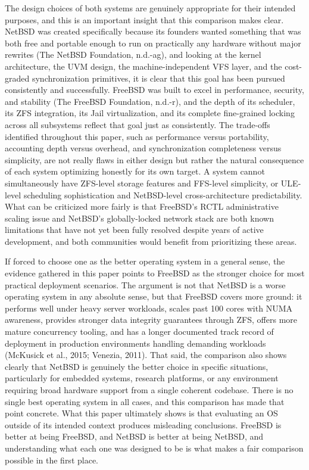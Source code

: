 The design choices of both systems are genuinely appropriate for their intended purposes, and this is an important insight that this comparison makes clear. NetBSD was created specifically because its founders wanted something that was both free and portable enough to run on practically any hardware without major rewrites (The NetBSD Foundation, n.d.-ag), and looking at the kernel architecture, the UVM design, the machine-independent VFS layer, and the cost-graded synchronization primitives, it is clear that this goal has been pursued consistently and successfully. FreeBSD was built to excel in performance, security, and stability (The FreeBSD Foundation, n.d.-r), and the depth of its scheduler, its ZFS integration, its Jail virtualization, and its complete fine-grained locking across all subsystems reflect that goal just as consistently. The trade-offs identified throughout this paper, such as performance versus portability, accounting depth versus overhead, and synchronization completeness versus simplicity, are not really flaws in either design but rather the natural consequence of each system optimizing honestly for its own target. A system cannot simultaneously have ZFS-level storage features and FFS-level simplicity, or ULE-level scheduling sophistication and NetBSD-level cross-architecture predictability. What can be criticized more fairly is that FreeBSD's RCTL administrative scaling issue and NetBSD's globally-locked network stack are both known limitations that have not yet been fully resolved despite years of active development, and both communities would benefit from prioritizing these areas.


If forced to choose one as the better operating system in a general sense, the evidence gathered in this paper points to FreeBSD as the stronger choice for most practical deployment scenarios. The argument is not that NetBSD is a worse operating system in any absolute sense, but that FreeBSD covers more ground: it performs well under heavy server workloads, scales past 100 cores with NUMA awareness, provides stronger data integrity guarantees through ZFS, offers more mature concurrency tooling, and has a longer documented track record of deployment in production environments handling demanding workloads (McKusick et al., 2015; Venezia, 2011). That said, the comparison also shows clearly that NetBSD is genuinely the better choice in specific situations, particularly for embedded systems, research platforms, or any environment requiring broad hardware support from a single coherent codebase. There is no single best operating system in all cases, and this comparison has made that point concrete. What this paper ultimately shows is that evaluating an OS outside of its intended context produces misleading conclusions. FreeBSD is better at being FreeBSD, and NetBSD is better at being NetBSD, and understanding what each one was designed to be is what makes a fair comparison possible in the first place.